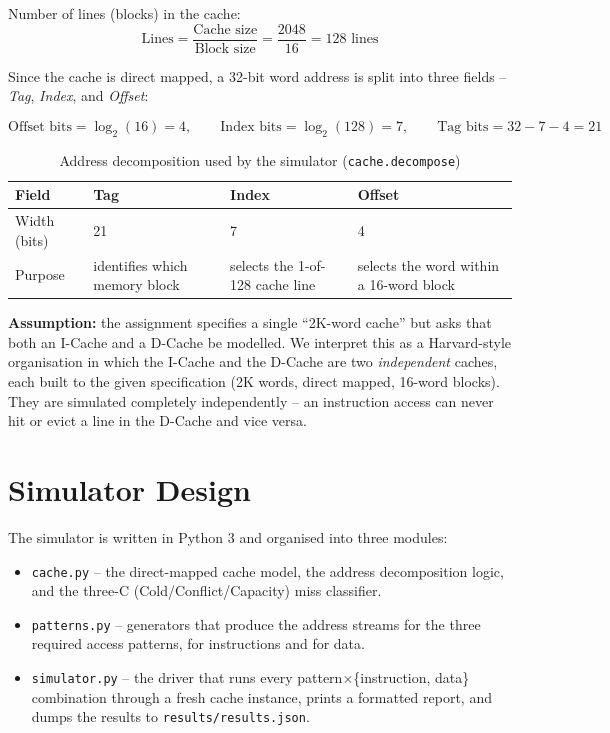 \documentclass[11pt]{article}
\begin{document}
Number of lines (blocks) in the cache:
\[
\text{Lines} = \frac{\text{Cache size}}{\text{Block size}} = \frac{2048}{16} = 128 \text{ lines}
\]

Since the cache is direct mapped, a 32-bit word address is split into
three fields -- \emph{Tag}, \emph{Index}, and \emph{Offset}:

\[
\text{Offset bits} = \log_2(16) = 4, \qquad
\text{Index bits} = \log_2(128) = 7, \qquad
\text{Tag bits} = 32 - 7 - 4 = 21
\]

\begin{table}[H]
\centering
\begin{tabular}{l p{3.2cm} p{3.2cm} p{3.6cm}}
\toprule
Field & Tag & Index & Offset \\
\midrule
Width (bits) & 21 & 7 & 4 \\
Purpose & identifies which memory block & selects the 1-of-128 cache line & selects the word within a 16-word block \\
\bottomrule
\end{tabular}
\caption{Address decomposition used by the simulator (\texttt{cache.decompose})}
\end{table}

\textbf{Assumption:} the assignment specifies a single ``2K-word cache''
but asks that both an I-Cache and a D-Cache be modelled. We interpret
this as a Harvard-style organisation in which the I-Cache and the
D-Cache are two \emph{independent} caches, each built to the given
specification (2K words, direct mapped, 16-word blocks). They are
simulated completely independently -- an instruction access can never
hit or evict a line in the D-Cache and vice versa.

\section{Simulator Design}

The simulator is written in Python 3 and organised into three modules:

\begin{itemize}[leftmargin=1.6em]
  \item \texttt{cache.py} -- the direct-mapped cache model, the address
        decomposition logic, and the three-C (Cold/Conflict/Capacity)
        miss classifier.
  \item \texttt{patterns.py} -- generators that produce the address
        streams for the three required access patterns, for
        instructions and for data.
  \item \texttt{simulator.py} -- the driver that runs every
        pattern$\times$\{instruction, data\} combination through a
        fresh cache instance, prints a formatted report, and dumps the
        results to \texttt{results/results.json}.
\end{itemize}
\end{document}

